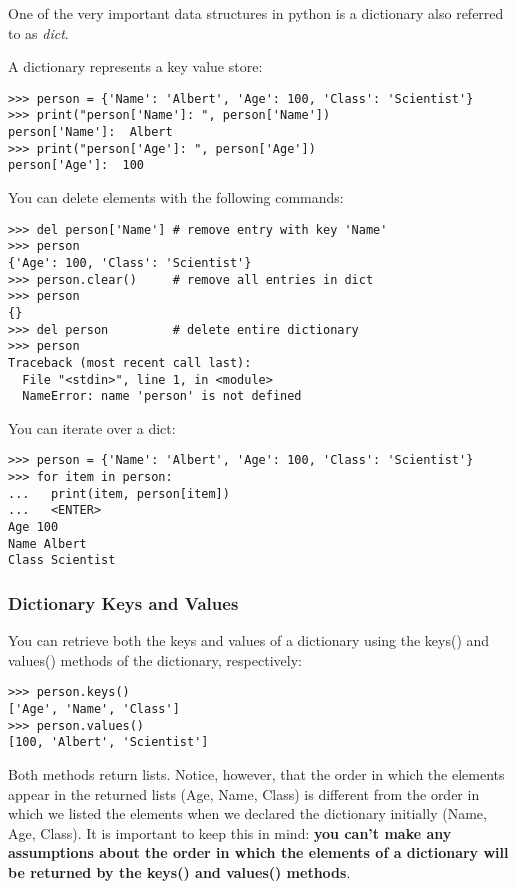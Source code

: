 One of the very important data structures in python is a dictionary also
referred to as \emph{dict}.

A dictionary represents a key value store:

\begin{verbatim}
>>> person = {'Name': 'Albert', 'Age': 100, 'Class': 'Scientist'}
>>> print("person['Name']: ", person['Name'])
person['Name']:  Albert
>>> print("person['Age']: ", person['Age'])
person['Age']:  100
\end{verbatim}

You can delete elements with the following commands:

\begin{verbatim}
>>> del person['Name'] # remove entry with key 'Name'
>>> person
{'Age': 100, 'Class': 'Scientist'}
>>> person.clear()     # remove all entries in dict
>>> person
{}
>>> del person         # delete entire dictionary
>>> person
Traceback (most recent call last):
  File "<stdin>", line 1, in <module>
  NameError: name 'person' is not defined
\end{verbatim}

You can iterate over a dict:

\begin{verbatim}
>>> person = {'Name': 'Albert', 'Age': 100, 'Class': 'Scientist'}
>>> for item in person:
...   print(item, person[item])
...   <ENTER>
Age 100
Name Albert
Class Scientist
\end{verbatim}

\subsubsection{Dictionary Keys and
Values}\label{dictionary-keys-and-values}

You can retrieve both the keys and values of a dictionary using the
keys() and values() methods of the dictionary, respectively:

\begin{verbatim}
>>> person.keys()
['Age', 'Name', 'Class']
>>> person.values()
[100, 'Albert', 'Scientist']
\end{verbatim}

Both methods return lists. Notice, however, that the order in which the
elements appear in the returned lists (Age, Name, Class) is different
from the order in which we listed the elements when we declared the
dictionary initially (Name, Age, Class). It is important to keep this in
mind: \textbf{you can't make any assumptions about the order in which
the elements of a dictionary will be returned by the keys() and values()
methods}.

